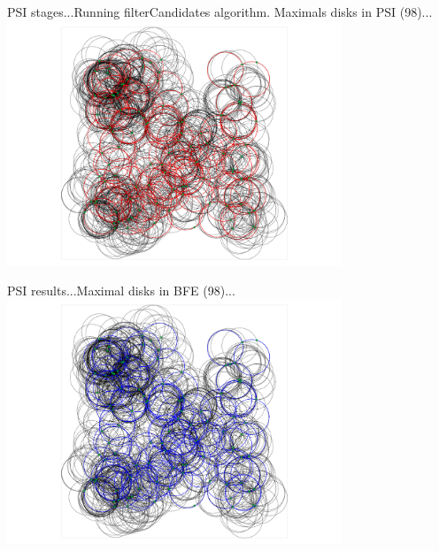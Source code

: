 \documentclass{beamer}
\begin{document}
%

%


\begin{frame}{PSI stages...}{Running filterCandidates algorithm. Maximals disks in PSI (98)...}
    \centering
    \includegraphics[width=0.75\textwidth]{figures/psi7}
\end{frame}

\begin{frame}{PSI results...}{Maximal disks in BFE (98)...}
    \centering
    \includegraphics[width=0.75\textwidth]{figures/psi8}
\end{frame}
\end{document}
